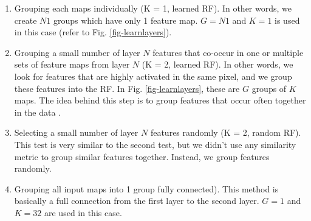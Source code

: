 \documentclass{article} %
\begin{document}
\begin{enumerate}

\item Grouping each maps individually (K = 1, learned RF). In other words, we create $N1$ groups which have only 1 feature map. 
$G = N1$ and $K = 1$ is used in this case (refer to Fig. \ref{fig-learnlayers}).

\item Grouping a small number of layer $N$ features that co-occur in one or multiple sets of feature maps from layer $N$ (K = 2, learned RF). 
In other words, we look for features that are highly activated in the same pixel, and we group these features into the RF.
In Fig. \ref{fig-learnlayers}, these are $G$ groups of $K$ maps.
The idea behind this step is to group features that occur often together in the data \cite{masquelier2007learning}.

\item Selecting a small number of layer $N$ features randomly (K = 2, random RF).
This test is very similar to the second test, but we didn't use any similarity metric to group similar features together.
Instead, we group features randomly.

\item Grouping all input maps into 1 group fully connected).
This method is basically a full connection from the first layer to the second layer. 
$G = 1$ and $K = 32$ are used in this case.

\end{enumerate}
\end{document}
